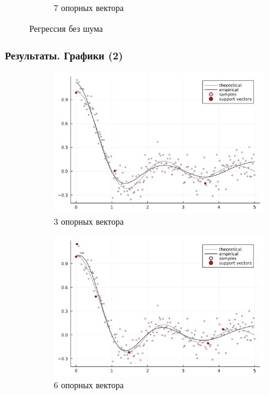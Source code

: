 \documentclass{beamer}
\begin{document}
\begin{frame}
\begin{figure}
\begin{subfigure}{0.4\textwidth}
			\caption{7 опорных вектора}
		\end{subfigure}
		\caption{Регрессия без шума}
	\end{figure}
\end{frame}

\begin{frame}
	\frametitle{Результаты. Графики (2)}
	\begin{figure}
		\centering
		\begin{subfigure}{0.4\textwidth}
			\includegraphics[width=\linewidth]{../model_noise3.png}
			\caption{3 опорных вектора}
		\end{subfigure}
		\begin{subfigure}{0.4\textwidth}
			\includegraphics[width=\linewidth]{../model_noise6.png}
			\caption{6 опорных вектора}
		\end{subfigure} \\
		\begin{subfigure}{0.4\textwidth}

\end{subfigure}
\end{figure}
\end{frame}
\end{document}
